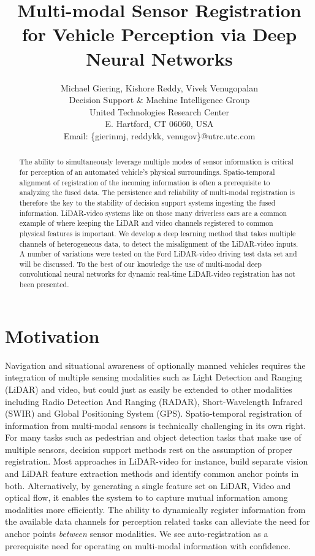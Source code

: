 \documentclass{article}
\title{Multi-modal Sensor Registration for Vehicle Perception via Deep Neural Networks}
\author{Michael Giering, Kishore Reddy, Vivek Venugopalan\\
Decision Support \& Machine Intelligence Group \\
United Technologies Research Center\\
E. Hartford, CT 06060, USA \\
Email: \{gierinmj, reddykk, venugov\}@utrc.utc.com}
\begin{document}
\maketitle

\begin{abstract}

The ability to simultaneously leverage multiple modes of sensor information is critical for perception of an automated vehicle's physical surroundings. Spatio-temporal alignment of registration of the incoming information is often a prerequisite to analyzing the fused data. The persistence and reliability of multi-modal registration is therefore the key to the stability of decision support systems ingesting the fused information. LiDAR-video systems like on those many driverless cars are a common example of where keeping the LiDAR and video channels registered to common physical features is important. We develop a deep learning method that takes multiple channels of heterogeneous data, to detect the misalignment of the LiDAR-video inputs.  A number of variations were tested on the Ford LiDAR-video driving test data set and will be discussed. To the best of our knowledge the use of multi-modal deep convolutional neural networks for dynamic real-time LiDAR-video registration has not been presented.

\end{abstract}

\section{Motivation} %
\label{sec:motivation}

Navigation and situational awareness of optionally manned vehicles requires the integration of multiple sensing modalities such as Light Detection and Ranging (LiDAR) and video, but could just as easily be extended to other modalities including Radio Detection And Ranging (RADAR), Short-Wavelength Infrared (SWIR) and Global Positioning System (GPS). Spatio-temporal registration of information from multi-modal sensors is technically challenging in its own right. For many tasks such as pedestrian and object detection tasks that make use of multiple sensors, decision support methods rest on the assumption of proper registration. Most approaches \cite{Bodensteiner2012Real-time-} in LiDAR-video for instance, build separate vision and LiDAR feature extraction methods and identify common anchor points in both. Alternatively, by generating a single feature set on LiDAR, Video and optical flow, it enables the system to to capture mutual information among modalities more efficiently. The ability to dynamically register information from the available data channels for perception related tasks can alleviate the need for anchor points \emph{between} sensor modalities. We see auto-registration as a prerequisite need for operating on multi-modal information with confidence.
\end{document}
